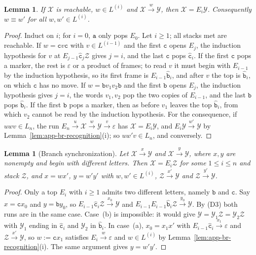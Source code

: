 \documentclass[11pt]{article}
\numberwithin{equation}{section}
\theoremstyle{plain}
\newtheorem{lemma}[theorem]{Lemma}
\theoremstyle{definition}
\theoremstyle{remark}
\newcommand{\eps}{\varepsilon}
\theoremstyle{plain}
\begin{document}
\begin{lemma}\label{lem:app-br-exchange}
\label{lem:app-tl-recognition}
If $\mathcal X$ is reachable, $w\in L^{(i)}$ and $\mathcal X\xrightarrow{w}\mathcal Y$, then
$\mathcal X=E_i\mathcal Y$.  Consequently $w\equiv w'$ for all $w,w'\in L^{(i)}$.
\end{lemma}

\begin{proof}
Induct on $i$; for $i=0$, $\mathtt a$ only pops $E_0$.  Let $i\ge1$; all stacks met
are reachable.  If $w=\mathtt cv\mathtt c$ with $v\in L^{(i-1)}$ and the first
$\mathtt c$ opens $E_j$, the induction hypothesis for $v$ at
$E_{j-1}\hat{\mathtt c}_j\mathcal Z$ gives $j=i$, and the last $\mathtt c$ pops
$\hat{\mathtt c}_i$.  If the first $\mathtt c$ pops a marker, the rest is $\eps$ or a
product of frames; to read $v$ it must begin with $E_{i-1}$ by the induction
hypothesis, so its first frame is $E_{i-1}\hat{\mathtt b}_i$, and after $v$ the top
is $\hat{\mathtt b}_i$, on which $\mathtt c$ has no move.  If
$w=\mathtt bv_1v_2\mathtt b$ and the first $\mathtt b$ opens $E_j$, the induction
hypothesis gives $j=i$, the words $v_1,v_2$ pop the two copies of $E_{i-1}$, and
the last $\mathtt b$ pops $\hat{\mathtt b}_i$.  If the first $\mathtt b$ pops a marker,
then as before $v_1$ leaves the top $\hat{\mathtt b}_i$, from which $v_2$ cannot be
read by the induction hypothesis.  For the consequence, if $uwv\in L_n$, the run
$E_n\xrightarrow{u}\mathcal X\xrightarrow{w}\mathcal Y\xrightarrow{v}\eps$ has
$\mathcal X=E_i\mathcal Y$, and $E_i\mathcal Y\xrightarrow{w'}\mathcal Y$ by
Lemma~\ref{lem:app-br-recognition}(i); so $uw'v\in L_n$, and conversely.
\end{proof}

\begin{lemma}[Branch synchronization]\label{lem:app-br-branch}
Let $\mathcal X\xrightarrow{x}\mathcal Y$ and $\mathcal X\xrightarrow{y}\mathcal Y$, where $x,y$
are nonempty and begin with different letters.  Then $\mathcal X=E_i\mathcal Z$ for
some $1\le i\le n$ and stack $\mathcal Z$, and $x=wx'$, $y=w'y'$ with
$w,w'\in L^{(i)}$, $\mathcal Z\xrightarrow{x'}\mathcal Y$ and $\mathcal Z\xrightarrow{y'}\mathcal Y$.
\end{lemma}

\begin{proof}
Only a top $E_i$ with $i\ge1$ admits two different letters, namely $\mathtt b$ and
$\mathtt c$.  Say $x=\mathtt cx_0$ and $y=\mathtt by_0$, so
$E_{i-1}\hat{\mathtt c}_i\mathcal Z\xrightarrow{x_0}\mathcal Y$ and
$E_{i-1}E_{i-1}\hat{\mathtt b}_i\mathcal Z\xrightarrow{y_0}\mathcal Y$.  By (D3) both runs
are in the same case.  Case~(b) is impossible: it would give
$\mathcal Y=\mathcal Y_1\mathcal Z=\mathcal Y_2\mathcal Z$ with $\mathcal Y_1$ ending in
$\hat{\mathtt c}_i$ and $\mathcal Y_2$ in $\hat{\mathtt b}_i$.  In case~(a),
$x_0=x_1x'$ with $E_{i-1}\hat{\mathtt c}_i\xrightarrow{x_1}\eps$ and
$\mathcal Z\xrightarrow{x'}\mathcal Y$, so $w:=\mathtt cx_1$ satisfies $E_i\xrightarrow{w}\eps$
and $w\in L^{(i)}$ by Lemma~\ref{lem:app-br-recognition}(i).  The same argument
gives $y=w'y'$.
\end{proof}
\end{document}
